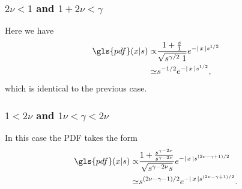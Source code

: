 \subsubsection{$2\nu<1$ and $1 + 2\nu<\gamma$}

Here we have 
%
\begin{align}
\gls{pdf}(x|s) \propto & \frac{1+\frac{s}{1}}{\sqrt{s^{\gamma /2 } \; 1}} e^{-\abs{x} s^{1/2}}  \\
\simeq & s^{-1/2} e^{-\abs{x} s^{1/2}} ,
\end{align}
%
which is identical to the previous case.

\subsubsection{$1<2\nu$ and $1 \nu<\gamma<2\nu$}

In this case the \gls{PDF} takes the form 
%
\begin{align}
\gls{pdf}(x|s) \propto & \frac{1+\frac{s^{\gamma -2\nu}}{s^{\gamma -2\nu}}}{\sqrt{s^{\gamma -2\nu} s}} e^{-\abs{x} s^{(2\nu-\gamma+1)/2}}  \\
\simeq & s^{(2 \nu-\gamma-1)/2} e^{-\abs{x} s^{(2\nu-\gamma+1)/2}} .
\end{align}

